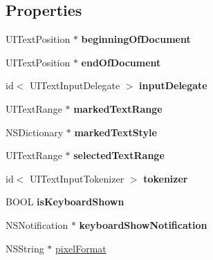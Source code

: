\subsection*{Properties}
\begin{DoxyCompactItemize}
\item 
\mbox{\label{interfaceCCEAGLView_aa23286cdabf34c5ee25af69994366355}} 
U\+I\+Text\+Position $\ast$ {\bfseries beginning\+Of\+Document}
\item 
\mbox{\label{interfaceCCEAGLView_a2a0578e4dcd3b59dc36d9ca37eeddc1e}} 
U\+I\+Text\+Position $\ast$ {\bfseries end\+Of\+Document}
\item 
\mbox{\label{interfaceCCEAGLView_a2fef6111cbcd4d1e08eb1dc37483daf2}} 
id$<$ U\+I\+Text\+Input\+Delegate $>$ {\bfseries input\+Delegate}
\item 
\mbox{\label{interfaceCCEAGLView_a869b04f90a844d0658b8619b0162e41f}} 
U\+I\+Text\+Range $\ast$ {\bfseries marked\+Text\+Range}
\item 
\mbox{\label{interfaceCCEAGLView_abafbaa7760740d6f48ec69a38e7c9708}} 
N\+S\+Dictionary $\ast$ {\bfseries marked\+Text\+Style}
\item 
\mbox{\label{interfaceCCEAGLView_a97300188ee4f31394337d77c528046b0}} 
U\+I\+Text\+Range $\ast$ {\bfseries selected\+Text\+Range}
\item 
\mbox{\label{interfaceCCEAGLView_adc1121ad6647d29d8a1600108ddfe74a}} 
id$<$ U\+I\+Text\+Input\+Tokenizer $>$ {\bfseries tokenizer}
\item 
\mbox{\label{interfaceCCEAGLView_ae692f1f62e39ab46f7a583bf1865c241}} 
B\+O\+OL {\bfseries is\+Keyboard\+Shown}
\item 
\mbox{\label{interfaceCCEAGLView_a1704f89e33802a6f279bac7d123b9f18}} 
N\+S\+Notification $\ast$ {\bfseries keyboard\+Show\+Notification}
\item 
N\+S\+String $\ast$ \hyperlink{interfaceCCEAGLView_a8ee71a24d5bf60736c884381d48f2d86}{pixel\+Format}
\item 

\end{DoxyCompactItemize}
